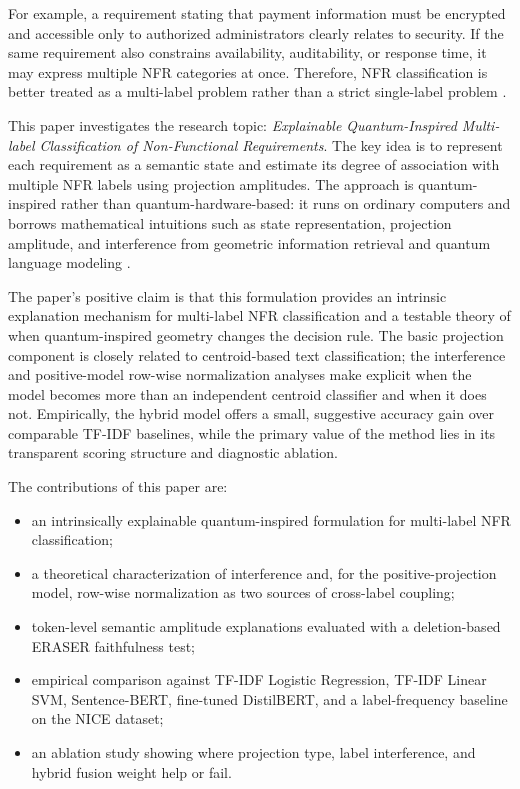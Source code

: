 \documentclass[runningheads]{llncs}
\begin{document}
For example, a requirement stating that payment information must be encrypted
and accessible only to authorized administrators clearly relates to security. If
the same requirement also constrains availability, auditability, or response
time, it may express multiple NFR categories at once. Therefore, NFR
classification is better treated as a multi-label problem rather than a strict
single-label problem \cite{tsoumakas2007multilabel,zhang2014review}.

This paper investigates the research topic: \emph{Explainable Quantum-Inspired
Multi-label Classification of Non-Functional Requirements}. The key idea is to
represent each requirement as a semantic state and estimate its degree of
association with multiple NFR labels using projection amplitudes. The approach
is quantum-inspired rather than quantum-hardware-based: it runs on ordinary
computers and borrows mathematical intuitions such as state representation,
projection amplitude, and interference from geometric information retrieval and
quantum language modeling \cite{vanrijsbergen2004geometry,sordoni2013quantum,li2019cnm}.

The paper's positive claim is that this formulation provides an intrinsic
explanation mechanism for multi-label NFR classification and a testable
theory of when quantum-inspired geometry changes the decision rule. The basic
projection component is closely related to centroid-based text classification;
the interference and positive-model row-wise normalization analyses make
explicit when the model becomes more than an independent centroid classifier
and when it does not. Empirically, the hybrid model offers a small, suggestive
accuracy gain over comparable TF-IDF baselines, while the primary value of the
method lies in its transparent scoring structure and diagnostic ablation.

The contributions of this paper are:
\begin{itemize}
    \item an intrinsically explainable quantum-inspired formulation for multi-label NFR classification;
    \item a theoretical characterization of interference and, for the positive-projection model, row-wise normalization as two sources of cross-label coupling;
    \item token-level semantic amplitude explanations evaluated with a deletion-based ERASER faithfulness test;
    \item empirical comparison against TF-IDF Logistic Regression, TF-IDF Linear SVM, Sentence-BERT, fine-tuned DistilBERT, and a label-frequency baseline on the NICE dataset;
    \item an ablation study showing where projection type, label interference, and hybrid fusion weight help or fail.
\end{itemize}
\end{document}
